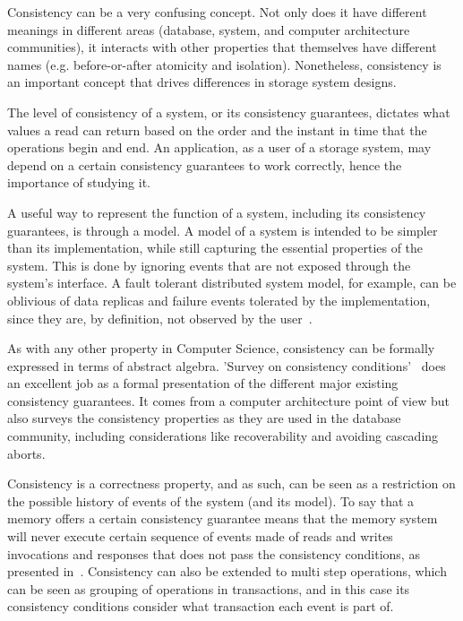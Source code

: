 \documentclass[12pt,conference]{IEEEtran}
\begin{document}
Consistency can be a very confusing concept. Not only does it have different meanings in different areas (database, system, and computer architecture communities), it interacts with other properties that themselves have different names (e.g. before-or-after atomicity and isolation). Nonetheless, consistency is an important concept that drives differences in storage system designs. 

The level of consistency of a system, or its consistency guarantees, dictates what values a read can return based on the order and the instant in time that the operations begin and end. An application, as a user of a storage system, may depend on a certain consistency guarantees to work correctly, hence the importance of studying it.

A useful way to represent the function of a system, including its consistency guarantees, is through a model. A model of a system is intended to be simpler than its implementation, while still capturing the essential properties of the system. This is done by ignoring events that are not exposed through the system's interface. A fault tolerant distributed system model, for example, can be oblivious of data replicas and failure events tolerated by the implementation, since they are, by definition, not observed by the user~\cite{avizienis2004basic}. 

As with any other property in Computer Science, consistency can be formally expressed in terms of abstract algebra. 'Survey on consistency conditions'~\cite{dziuma2013survey} does an excellent job as a formal presentation of the different major existing consistency guarantees. It comes from a computer architecture point of view but also surveys the consistency properties as they are used in the database community, including considerations like recoverability and avoiding cascading aborts.

Consistency is a correctness property, and as such, can be seen as a restriction on the possible history of events of the system (and its model). To say that a memory offers a certain consistency guarantee means that the memory system will never execute certain sequence of events made of reads and writes invocations and responses that does not pass the consistency conditions, as presented in~\cite{dziuma2013survey}. Consistency can also be extended to multi step operations, which can be seen as grouping of operations in transactions, and in this case its consistency conditions consider what transaction each event is part of.
\end{document}
